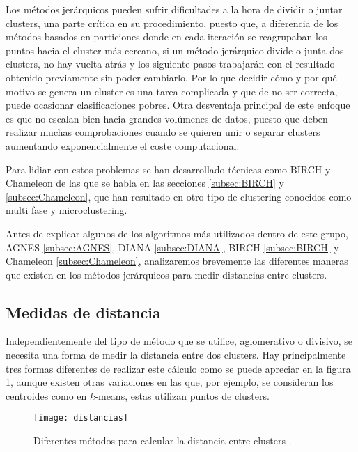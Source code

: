 \documentclass[10pt, a4paper]{article}
\begin{document}
Los métodos jerárquicos pueden sufrir dificultades a la hora de dividir o juntar clusters, una parte crítica en su procedimiento, puesto que, a diferencia de los métodos basados en particiones donde en cada iteración se reagrupaban los puntos hacia el cluster más cercano, si un método jerárquico divide o junta dos clusters, no hay vuelta atrás y los siguiente pasos trabajarán con el resultado obtenido previamente sin poder cambiarlo. Por lo que decidir cómo y por qué motivo se genera un cluster es una tarea complicada y que de no ser correcta, puede ocasionar clasificaciones pobres. Otra desventaja principal de este enfoque es que no escalan bien hacia grandes volúmenes de datos, puesto que deben realizar muchas comprobaciones cuando se quieren unir o separar clusters aumentando exponencialmente el coste computacional.

Para lidiar con estos problemas se han desarrollado técnicas como BIRCH y Chameleon de las que se habla en las secciones \ref{subsec:BIRCH} y \ref{subsec:Chameleon}, que han resultado en otro tipo de clustering conocidos como multi fase y microclustering.

Antes de explicar algunos de los algoritmos más utilizados dentro de este grupo, AGNES \ref{subsec:AGNES}, DIANA \ref{subsec:DIANA}, BIRCH \ref{subsec:BIRCH} y Chameleon \ref{subsec:Chameleon}, analizaremos brevemente las diferentes maneras que existen en los métodos jerárquicos para medir distancias entre clusters.




\subsection{\textbf{Medidas de distancia}} \label{subsec:Medidas de distancia}


Independientemente del tipo de método que se utilice, aglomerativo o divisivo, se necesita una forma de medir la distancia entre dos clusters.
Hay principalmente tres formas diferentes de realizar este cálculo como se puede apreciar en la figura \ref{fig:distancias}, aunque existen otras variaciones en las que, por ejemplo, se consideran los centroides como en $k$-means, estas utilizan puntos de clusters.

\begin{figure}[ht]
\centering
\texttt{[image: distancias]}
\caption{Diferentes métodos para calcular la distancia entre clusters \cite{babu}.}
\label{fig:distancias}
\end{figure}
\end{document}

